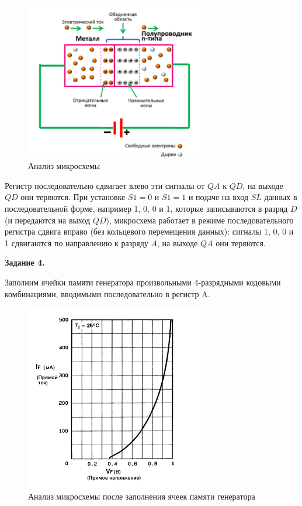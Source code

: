 \documentclass[spec, och, labwork]{shiza}
\begin{document}
  \begin{figure}[H]
    \centering     
    \includegraphics[width=0.7\textwidth]{photo/5}
    \caption{Анализ микросхемы}
  \end{figure}

  Регистр последовательно сдвигает влево эти сигналы от $QA$ к $QD$, на выходе $QD$ они теряются. При установке $S1 = 0$ и $S1 = 1$ и подаче на вход $SL$ данных в последовательной форме, например 1, 0, 0 и 1, которые записываются в разряд $D$ (и передаются на выход $QD$), микросхема работает в режиме последовательного регистра сдвига вправо (без кольцевого перемещения данных): сигналы 1, 0, 0 и 1 сдвигаются по направлению к разряду $A$, на выходе $QA$ они теряются.

  \textbf{Задание 4.}

  Заполним ячейки памяти генератора произвольными 4-разрядными кодовыми комбинациями, вводимыми последовательно в регистр A.

  \begin{figure}[H]
    \centering     
    \includegraphics[width=0.7\textwidth]{photo/6}
    \caption{Анализ микросхемы после заполнения ячеек памяти генератора}
  \end{figure}
\end{document}
